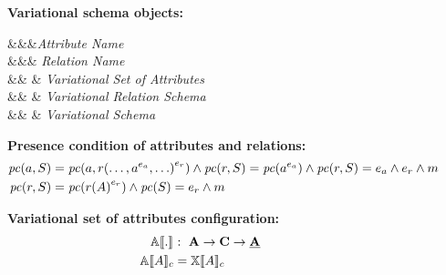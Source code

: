 \begin{figure}

\textbf{Variational schema objects:}
\begin{syntax}
\synDef \vAtt \attNames &&&\textit{Attribute Name}\\
\synDef \vRel \relNames &&& \textit{Relation Name}\\
\synDef {} &\eqq& 
 & \textit{Variational Set of Attributes}\\
\synDef \vRelSch \vRelSchSet &\eqq& \vRelDef & \textit{Variational Relation Schema}\\
\synDef \vSch \vSchSet &\eqq& \vSchDef & \textit{Variational Schema}
\end{syntax}

\medskip
\textbf{Presence condition of attributes and relations:}
\begin{alignat*}{1}
\getPCfrom {\vAtt} {\vSch} &= \getPCfrom {\vAtt} {\vRel \annot [\dimMeta_\vRel] {(\ldots, \annot [\dimMeta_\vAtt] \vAtt, \ldots)}} \wedge \getPCfrom \vRel \vSch = \getPC {\annot [\dimMeta_\vAtt] \vAtt} \wedge \getPCfrom \vRel \vSch=
\dimMeta_\vAtt \wedge \dimMeta_\vRel \wedge \fModel\\
\getPCfrom {\vRel} \vSch &= \getPC {\vRel \annot [\dimMeta_\vRel] {(\vAttList)}} \wedge \getPC {\vSch} = \dimMeta_\vRel \wedge \fModel 
\end{alignat*}

\medskip
\textbf{Variational set of attributes configuration:}
\begin{alignat*}{1}
 \olSem [] . &: \ \vAttSet \to \confSet \to \pAttSet\\
 \olSem \vAttList &= \elemSem \vAttList
 \end{alignat*}


\end{figure}
